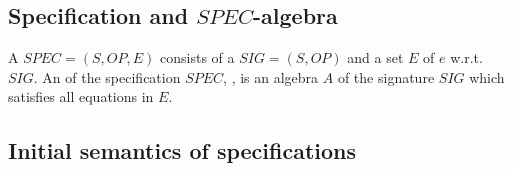 \subsection{Specification and $SPEC$-algebra}
\bit
\w A  $SPEC = (S, OP, E)$ consists of a  $SIG
= (S, OP)$ and a set $E$ of  $e$ w.r.t. $SIG$.
\w An  of the specification $SPEC$, , is an
algebra $A$ of the signature $SIG$ which satisfies all equations in $E$.
\eit


\subsection{Initial semantics of specifications}



